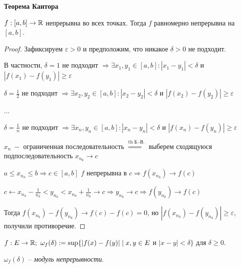 \begin{theorem} \textbf{Теорема Кантора}

$f:[a, b]\rightarrow \mathbb{R}$ непрерывна во всех точках. Тогда $f$ равномерно непрерывна на $[a, b]$.
\end{theorem}

\begin{proof}
    Зафиксируем $\varepsilon>0$ и предположим, что никакое $\delta>0$ не подходит. 
    
    В частности, $\delta =1$ не подходит $\Rightarrow \exists x_1, y_1\in [a, b]: |x_1-y_1|<\delta$ и $|f(x_1)-f(y_1)|\geq \varepsilon$

    $\delta =\frac{1}{2}$ не подходит $\Rightarrow \exists x_2, y_2\in [a, b]: |x_2-y_2|<\delta$ и $|f(x_2)-f(y_2)|\geq \varepsilon$

    ...

    $\delta =\frac{1}{n}$ не подходит $\Rightarrow \exists x_n, y_n\in [a, b]: |x_n-y_n|<\delta$ и $|f(x_n)-f(y_n)|\geq \varepsilon$

    $x_n\ -$ ограниченная последовательность $\overset{\text{th Б.-В.}}{\Rightarrow} $ выберем сходящуюся подпоследовательность $x_{n_k}\rightarrow c$

    $a\leq x_{n_k}\leq b\Rightarrow c\in [a, b]$ $f$ непрерывна в $c\Rightarrow f(x_{n_k})\rightarrow f(c)$

    $c\leftarrow x_{n_k}-\frac{1}{n_k}< y_{n_k}<x_{n_k}+\frac{1}{n_k}\rightarrow c\Rightarrow y_{n_k}\rightarrow c\Rightarrow f(y_{n_k})\rightarrow f(c)$

    Тогда $f(x_{n_k})-f(y_{n_k})\rightarrow f(c)-f(c)=0$, но $|f(x_{n_k})-f(y_{n_k})|\geq \varepsilon$, получили противоречие.
\end{proof}

\begin{definition}
    $f:E\rightarrow \mathbb{R};\ \omega_f(\delta):=\sup \{|f(x)-f(y)| \mid x, y\in E $ и $ |x-y|<\delta \}$ для $\delta\geq 0$.

    $\omega_f(\delta)$ – \textit{модуль непрерывности}.
\end{definition}

